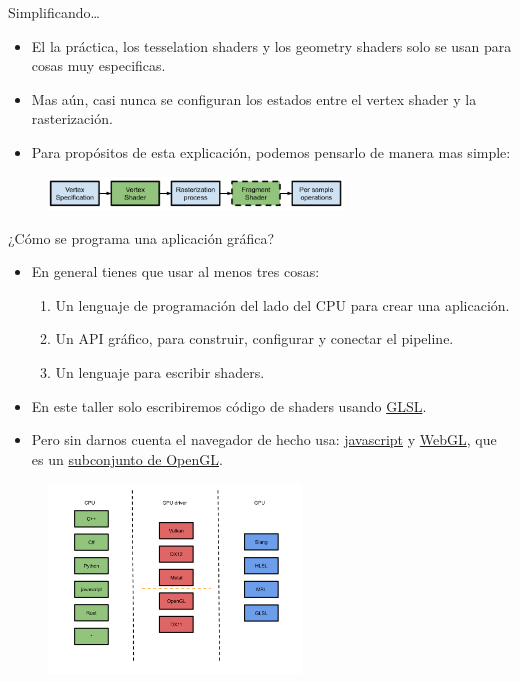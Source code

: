 \begin{frame}{Simplificando\ldots}
\begin{itemize}
    \item El la práctica, los tesselation shaders y los geometry shaders solo se usan para cosas muy especificas.
    \item Mas aún, casi nunca se configuran los estados entre el vertex shader y la rasterización.
    \item Para propósitos de esta explicación, podemos pensarlo de manera mas simple:    
\end{itemize}
\begin{figure}[htb]
  \centering
  \includegraphics[width=0.7\textwidth]{img/SimplifiedPipeline}
\end{figure}
\end{frame}

\begin{frame}[allowframebreaks]{¿Cómo se programa una aplicación gráfica?}
\begin{itemize}
    \item En general tienes que usar al menos tres cosas:
    \begin{enumerate}
        \item Un lenguaje de programación del lado del CPU para crear una aplicación.
        \item Un API gráfico, para construir, configurar y conectar el pipeline.
        \item Un lenguaje para escribir shaders.
    \end{enumerate}
    \item En este taller solo escribiremos código de shaders usando \href{https://www.khronos.org/opengl/wiki/OpenGL_Shading_Language}{GLSL}.
    \item Pero sin darnos cuenta el navegador de hecho usa: \href{https://en.wikipedia.org/wiki/JavaScript}{javascript} y \href{https://www.khronos.org/webgl/}{WebGL}, que es un \href{https://www.khronos.org/opengles/}{subconjunto de OpenGL}.
\end{itemize}
\begin{figure}[htb]
  \centering
  \includegraphics[width=0.6\textwidth]{img/APIs}
\end{figure}
\end{frame}

